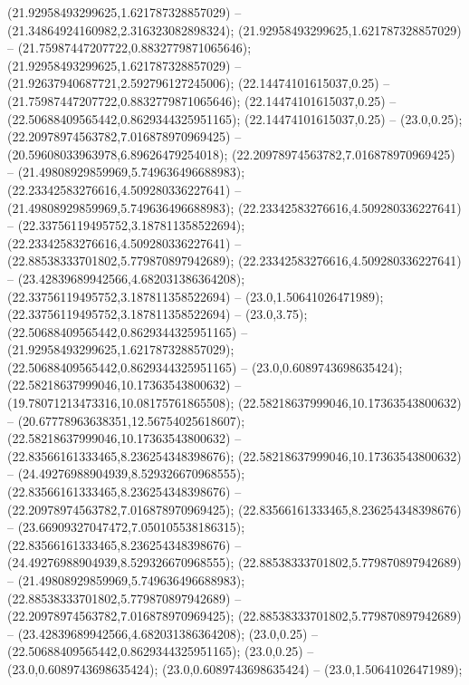  (21.92958493299625,1.621787328857029) -- (21.34864924160982,2.316323082898324);
 (21.92958493299625,1.621787328857029) -- (21.75987447207722,0.8832779871065646);
 (21.92958493299625,1.621787328857029) -- (21.92637940687721,2.592796127245006);
 (22.14474101615037,0.25) -- (21.75987447207722,0.8832779871065646);
 (22.14474101615037,0.25) -- (22.50688409565442,0.8629344325951165);
 (22.14474101615037,0.25) -- (23.0,0.25);
 (22.20978974563782,7.016878970969425) -- (20.59608033963978,6.89626479254018);
 (22.20978974563782,7.016878970969425) -- (21.49808929859969,5.749636496688983);
 (22.23342583276616,4.509280336227641) -- (21.49808929859969,5.749636496688983);
 (22.23342583276616,4.509280336227641) -- (22.33756119495752,3.187811358522694);
 (22.23342583276616,4.509280336227641) -- (22.88538333701802,5.779870897942689);
 (22.23342583276616,4.509280336227641) -- (23.42839689942566,4.682031386364208);
 (22.33756119495752,3.187811358522694) -- (23.0,1.50641026471989);
 (22.33756119495752,3.187811358522694) -- (23.0,3.75);
 (22.50688409565442,0.8629344325951165) -- (21.92958493299625,1.621787328857029);
 (22.50688409565442,0.8629344325951165) -- (23.0,0.6089743698635424);
 (22.58218637999046,10.17363543800632) -- (19.78071213473316,10.08175761865508);
 (22.58218637999046,10.17363543800632) -- (20.67778963638351,12.56754025618607);
 (22.58218637999046,10.17363543800632) -- (22.83566161333465,8.236254348398676);
 (22.58218637999046,10.17363543800632) -- (24.49276988904939,8.529326670968555);
 (22.83566161333465,8.236254348398676) -- (22.20978974563782,7.016878970969425);
 (22.83566161333465,8.236254348398676) -- (23.66909327047472,7.050105538186315);
 (22.83566161333465,8.236254348398676) -- (24.49276988904939,8.529326670968555);
 (22.88538333701802,5.779870897942689) -- (21.49808929859969,5.749636496688983);
 (22.88538333701802,5.779870897942689) -- (22.20978974563782,7.016878970969425);
 (22.88538333701802,5.779870897942689) -- (23.42839689942566,4.682031386364208);
 (23.0,0.25) -- (22.50688409565442,0.8629344325951165);
 (23.0,0.25) -- (23.0,0.6089743698635424);
 (23.0,0.6089743698635424) -- (23.0,1.50641026471989);
